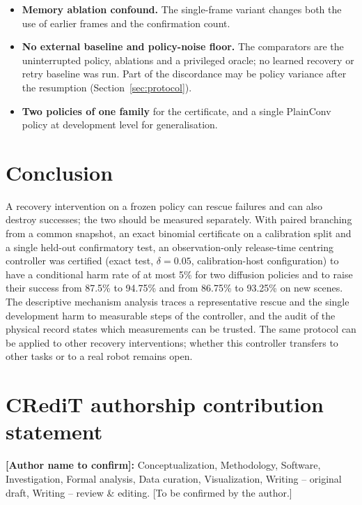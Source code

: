 \documentclass[preprint,12pt]{elsarticle}
\begin{document}
\begin{itemize}
\item \textbf{Memory ablation confound.} The single-frame variant changes both the use of earlier frames and the confirmation count.
\item \textbf{No external baseline and policy-noise floor.} The comparators are the uninterrupted policy, ablations and a privileged oracle; no learned recovery or retry baseline was run. Part of the discordance may be policy variance after the resumption (Section~\ref{sec:protocol}).
\item \textbf{Two policies of one family} for the certificate, and a single PlainConv policy at development level for generalisation.
\end{itemize}

\section{Conclusion}\label{sec:conclusion}

A recovery intervention on a frozen policy can rescue failures and can also destroy successes; the two should be measured separately. With paired branching from a common snapshot, an exact binomial certificate on a calibration split and a single held-out confirmatory test, an observation-only release-time centring controller was certified (exact test, $\delta=0.05$, calibration-host configuration) to have a conditional harm rate of at most 5\% for two diffusion policies and to raise their success from 87.5\% to 94.75\% and from 86.75\% to 93.25\% on new scenes. The descriptive mechanism analysis traces a representative rescue and the single development harm to measurable steps of the controller, and the audit of the physical record states which measurements can be trusted. The same protocol can be applied to other recovery interventions; whether this controller transfers to other tasks or to a real robot remains open.

\section*{CRediT authorship contribution statement}
\textbf{[Author name to confirm]:} Conceptualization, Methodology, Software, Investigation, Formal analysis, Data curation, Visualization, Writing -- original draft, Writing -- review \& editing. [To be confirmed by the author.]
\end{document}
